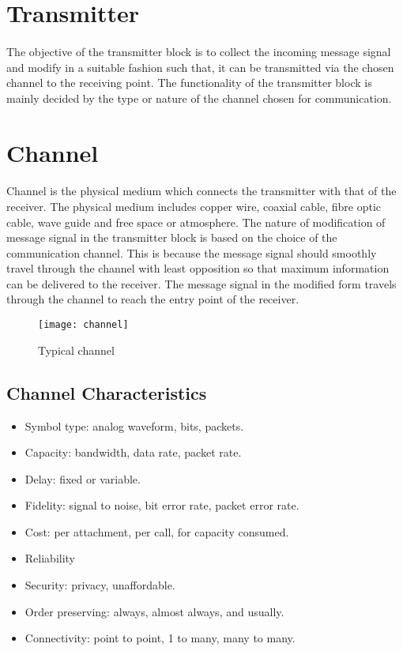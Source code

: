 \documentclass[14pt]{report}
\begin{document}
{\section{Transmitter}
\paragraph{}The objective of the transmitter block is to collect the incoming message signal and modify in a suitable fashion such that, it can be transmitted via the chosen channel to the receiving point. The functionality of the transmitter block is mainly decided by the type or nature of the channel chosen for communication.
\section{Channel}
\paragraph{}Channel is the physical medium which connects the transmitter with that of the receiver. The physical medium includes copper wire, coaxial cable, fibre optic cable, wave guide and free space or atmosphere. The nature of modification of message signal in the transmitter block is based on the choice of the communication channel. This is because the message signal should smoothly travel through the channel with least opposition so that maximum information can be delivered to the receiver. The message signal in the modified form travels through the channel to reach the entry point of the receiver.
\begin{figure}[ht]
\centering
\texttt{[image: channel]}
\caption{Typical channel}
\label{fig:chan}
\end{figure}
\subsection{Channel Characteristics}
\begin{itemize}
\item Symbol type: analog waveform, bits, packets.
\item Capacity: bandwidth, data rate, packet rate.
\item Delay: fixed or variable.
\item	Fidelity: signal to noise, bit error rate, packet error rate.
\item Cost: per attachment, per call, for capacity consumed.
\item 	Reliability
\item Security: privacy, unaffordable.
\item 	Order preserving: always, almost always, and usually.
\item 	Connectivity: point to point, 1 to many, many to many.
\end{itemize}
}
\end{document}

